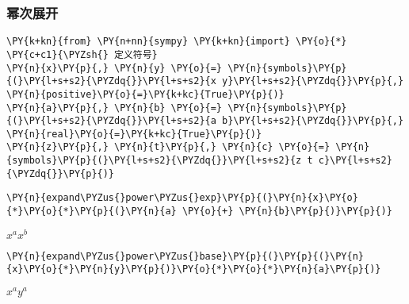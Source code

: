     \hypertarget{ux5e42ux6b21ux5c55ux5f00}{%
\subsubsection{幂次展开}\label{ux5e42ux6b21ux5c55ux5f00}}

    \begin{tcolorbox}[breakable, size=fbox, boxrule=1pt, pad at break*=1mm,colback=cellbackground, colframe=cellborder]
\begin{Verbatim}[commandchars=\\\{\}]
\PY{k+kn}{from} \PY{n+nn}{sympy} \PY{k+kn}{import} \PY{o}{*}
\PY{c+c1}{\PYZsh{} 定义符号}
\PY{n}{x}\PY{p}{,} \PY{n}{y} \PY{o}{=} \PY{n}{symbols}\PY{p}{(}\PY{l+s+s2}{\PYZdq{}}\PY{l+s+s2}{x y}\PY{l+s+s2}{\PYZdq{}}\PY{p}{,} \PY{n}{positive}\PY{o}{=}\PY{k+kc}{True}\PY{p}{)}
\PY{n}{a}\PY{p}{,} \PY{n}{b} \PY{o}{=} \PY{n}{symbols}\PY{p}{(}\PY{l+s+s2}{\PYZdq{}}\PY{l+s+s2}{a b}\PY{l+s+s2}{\PYZdq{}}\PY{p}{,} \PY{n}{real}\PY{o}{=}\PY{k+kc}{True}\PY{p}{)}
\PY{n}{z}\PY{p}{,} \PY{n}{t}\PY{p}{,} \PY{n}{c} \PY{o}{=} \PY{n}{symbols}\PY{p}{(}\PY{l+s+s2}{\PYZdq{}}\PY{l+s+s2}{z t c}\PY{l+s+s2}{\PYZdq{}}\PY{p}{)}
\end{Verbatim}
\end{tcolorbox}

    \begin{tcolorbox}[breakable, size=fbox, boxrule=1pt, pad at break*=1mm,colback=cellbackground, colframe=cellborder]
\begin{Verbatim}[commandchars=\\\{\}]
\PY{n}{expand\PYZus{}power\PYZus{}exp}\PY{p}{(}\PY{n}{x}\PY{o}{*}\PY{o}{*}\PY{p}{(}\PY{n}{a} \PY{o}{+} \PY{n}{b}\PY{p}{)}\PY{p}{)}
\end{Verbatim}
\end{tcolorbox}
 
            
    
    $\displaystyle x^{a} x^{b}$

    

    \begin{tcolorbox}[breakable, size=fbox, boxrule=1pt, pad at break*=1mm,colback=cellbackground, colframe=cellborder]
\begin{Verbatim}[commandchars=\\\{\}]
\PY{n}{expand\PYZus{}power\PYZus{}base}\PY{p}{(}\PY{p}{(}\PY{n}{x}\PY{o}{*}\PY{n}{y}\PY{p}{)}\PY{o}{*}\PY{o}{*}\PY{n}{a}\PY{p}{)}
\end{Verbatim}
\end{tcolorbox}
 
            
    
    $\displaystyle x^{a} y^{a}$
